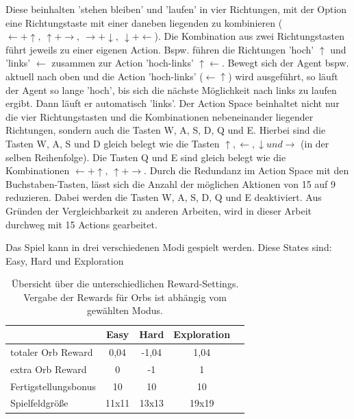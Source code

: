 Diese beinhalten 'stehen bleiben' und 'laufen' in vier Richtungen, mit der Option eine Richtungstaste mit einer daneben liegenden zu kombinieren ($ \leftarrow + \uparrow, ~ \uparrow + \rightarrow, ~ \rightarrow + \downarrow, ~\downarrow + \leftarrow $). Die Kombination aus zwei Richtungstasten führt jeweils zu einer eigenen Action. Bspw. führen die Richtungen 'hoch' $\uparrow$ und 'links' $\leftarrow$ zusammen zur Action 'hoch-links' $\uparrow \leftarrow$. Bewegt sich der Agent bspw. aktuell nach oben und die Action 'hoch-links' ($\leftarrow \uparrow$) wird ausgeführt, so läuft der Agent so lange 'hoch', bis sich die nächste Möglichkeit nach links zu laufen ergibt. Dann läuft er automatisch 'links'. Der Action Space beinhaltet nicht nur die vier Richtungstasten und die Kombinationen nebeneinander liegender Richtungen, sondern auch die Tasten W, A, S, D, Q und E. Hierbei sind die Tasten W, A, S und D gleich belegt wie die Tasten $\uparrow, \leftarrow, \downarrow und \rightarrow$ (in der selben Reihenfolge). Die Tasten Q und E sind gleich belegt wie die Kombinationen $\leftarrow + \uparrow, ~ \uparrow + \rightarrow$. Durch die Redundanz im Action Space mit den Buchstaben-Tasten, lässt sich die Anzahl der möglichen Aktionen von 15 auf 9 reduzieren. Dabei werden die Tasten W, A, S, D, Q und E deaktiviert. Aus Gründen der Vergleichbarkeit zu anderen Arbeiten, wird in dieser Arbeit durchweg mit 15 Actions gearbeitet.


Das Spiel kann in drei verschiedenen Modi gespielt werden. Diese States sind: Easy, Hard und Exploration

\begin{center}
 \begin{table}[htb!]
 \begin{center}
  \begin{tabular}{ l c c c c }
    \hline
     & Easy & Hard & Exploration \\ \hline \hline
     totaler Orb Reward & 0,04 & -1,04 & 1,04 \\ \hline
     extra Orb Reward & 0 & -1 & 1 \\ \hline
     Fertigstellungsbonus & 10 & 10 & 10 \\ \hline
     Spielfeldgröße & 11x11 & 13x13 & 19x19 \\ \hline
    \hline
  \end{tabular}
  \caption{Übersicht über die unterschiedlichen Reward-Settings. Vergabe der Rewards für Orbs ist abhängig vom gewählten Modus.}
  \label{tab:tab_reward_Modi}
  \end{center}
 \end{table}
\end{center} 


